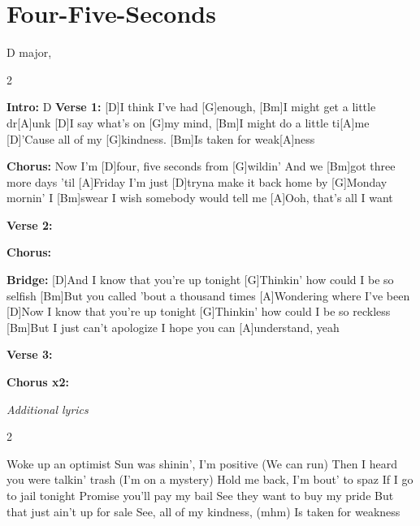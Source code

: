\documentclass[../../songbookMain]{subfiles}
\begin{document}
\section{Four-Five-Seconds}
{\tiny
D major,
}

\begin{guitar}
\begin{multicols}{2}

\textbf{Intro:} D
\textbf{Verse 1:}
[D]I think I've had [G]enough, 
[Bm]I might get a little dr[A]unk
[D]I say what's on [G]my mind,
[Bm]I might do a little ti[A]me
[D]'Cause all of my [G]kindness. 
[Bm]Is taken for weak[A]ness

\textbf{Chorus:}
Now I'm [D]four, five seconds from [G]wildin'
And we [Bm]got three more days 'til [A]Friday
I'm just [D]tryna make it back home by [G]Monday mornin'
I [Bm]swear I wish somebody would tell me
[A]Ooh, that's all I want

\textbf{Verse 2:}

\textbf{Chorus:}

\textbf{Bridge:}
[D]And I know that you're up tonight
[G]Thinkin' how could I be so selfish
[Bm]But you called 'bout a thousand times
[A]Wondering where I've been
[D]Now I know that you're up tonight
[G]Thinkin' how could I be so reckless
[Bm]But I just can't apologize
I hope you can [A]understand, yeah

\textbf{Verse 3:}

\textbf{Chorus x2:}


\end{multicols}

\begin{center}
\textit{Additional lyrics}
\end{center}

\flushleft
\vspace{-7em}

\begin{multicols}{2}\begin{flushleft}
Woke up an optimist
Sun was shinin', I'm positive (We can run)
Then I heard you were talkin' trash (I'm on a mystery)
Hold me back, I'm bout' to spaz
\columnbreak
If I go to jail tonight
Promise you'll pay my bail
See they want to buy my pride
But that just ain't up for sale
See, all of my kindness, (mhm)
Is taken for weakness

\end{flushleft}
\end{multicols}
\end{guitar}
\end{document}
